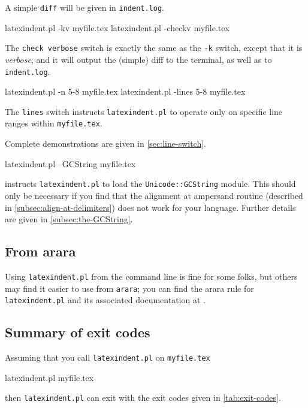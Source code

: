  A simple \texttt{diff} will be given in \texttt{indent.log}.

 \begin{commandshell}
latexindent.pl -kv myfile.tex
latexindent.pl -checkv myfile.tex
\end{commandshell}
  The \texttt{check verbose}
 switch is exactly the same as the \texttt{-k} switch, except that it is \emph{verbose},
 and it will output the (simple) diff to the terminal, as well as to \texttt{indent.log}.

 \begin{commandshell}
latexindent.pl -n 5-8 myfile.tex
latexindent.pl -lines 5-8 myfile.tex
\end{commandshell}
  The \texttt{lines} switch instructs
 \texttt{latexindent.pl} to operate only on specific line ranges within
 \texttt{myfile.tex}.

 Complete demonstrations are given in \cref{sec:line-switch}.

 \begin{commandshell}
latexindent.pl --GCString myfile.tex
\end{commandshell}
  instructs \texttt{latexindent.pl} to load the
 \texttt{Unicode::GCString} module. This should only be necessary if you find that the
 alignment at ampersand routine (described in \cref{subsec:align-at-delimiters}) does not
 work for your language. Further details are given in \cref{subsec:the-GCString}.

\subsection{From arara}\label{sec:arara}
 Using \texttt{latexindent.pl} from the command line is fine for some folks, but others
 may find it easier to use from \texttt{arara}; you can find the arara rule for
 \texttt{latexindent.pl} and its associated documentation at \cite{paulo}.

\subsection{Summary of exit codes}
 Assuming that you call \texttt{latexindent.pl} on \texttt{myfile.tex}
 \begin{commandshell}
latexindent.pl myfile.tex
\end{commandshell}
 then \texttt{latexindent.pl} can exit with the exit codes given in \cref{tab:exit-codes}.

